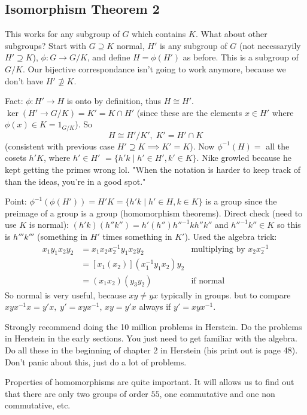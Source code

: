 \documentclass{article}
\theoremstyle{plain}
\theoremstyle{remark}
\begin{document}
\subsection{Isomorphism Theorem 2}
This works for any subgroup of $G$ which contains $K$.
What about other subgroups?
Start with $G \supseteq K$ normal,
$H'$ is any subgroup of $G$ (not necessaryily $H' \supseteq K$),
$\phi \colon G \to G/K$,
and define $H = \phi(H')$ as before.
This is a subgroup of $G/K$.
Our bijective correspondance isn't going to work anymore,
because we don't have $H' \not \supseteq K$.

Fact: $\phi \colon H' \to H$ is onto by definition, thus $H \cong H'$.
$\ker(H' \to G/K) = K' = K \cap H'$
(since these are the elements $x \in H'$ where $\phi(x) \in K = 1_{G/K}$).
So
\[
	H \cong H'/K', \; K' = H'\cap K
\]
(consistent with previous case $H' \supseteq K \implies K' = K$).
Now $\phi^{-1}(H) = $ all the cosets $h'K$, where $h' \in H'$
$= \{h'k \mid h' \in H', k' \in K\}$.
Nike growled because he kept getting the primes wrong lol.
"When the notation is harder to keep track of than the ideas,
you're in a good spot."

Point: $\phi^{-1}(\phi(H')) = H'K = \{h'k \mid h' \in H, k \in K\}$
is a group since the preimage of a group is a group
(homomorphism theorems).
Direct check (need to use $K$ is normal):
$(h'k)(h''k'') = h'(h'')h''^{-1}kh''k''$ and $h''^{-1}k'' \in K$
so this is $h'''k'''$ (something in $H'$ times something in $K'$).
Used the algebra trick:
\begin{align*}
	x_1y_1 x_2 y_2
	&= x_1x_2 x_2^{-1} y_1 x_2 y_2 &\text{multiplying by }x_2x_2^{-1}\\
	&= [x_1(x_2)](x_1^{-1}y_1x_2)y_2\\
	&= (x_1x_2)(y_3y_2) &\text{if normal}
\end{align*}
So normal is very useful, because $xy \neq yx$ typically in groups.
but to compare $xyx^{-1}x = y'x, \; y' =xyx^{-1}$,
$xy = y'x$ always if $y' = xyx^{-1}$.

Strongly recommend doing the 10 million problems in Herstein.
Do the problems in Herstein in the early sections.
You just need to get familiar with the algebra.
Do all these in the beginning of chapter 2 in Herstein
(his print out is page 48).
Don't panic about this, just do a lot of problems.

Properties of homomorphisms are quite important.
It will allows us to find out that there are only two groups of order $55$,
one commutative and one non commutative, etc.
\end{document}

